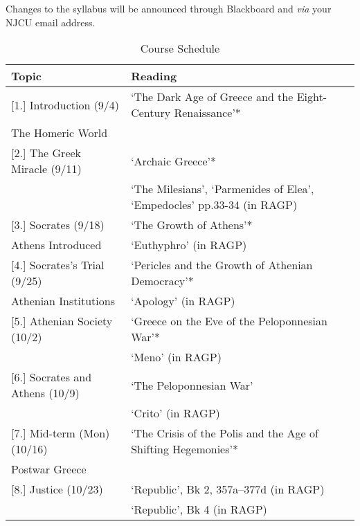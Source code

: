 \documentclass[article,oneside]{memoir}
\begin{document}
 Changes to the syllabus will be announced through Blackboard and \emph{via} your NJCU email address.  

\newpage
\begin{center}
\begin{longtable}{p{4.5cm}p{9cm}}
 
  \caption{Course Schedule} \\
  \toprule
  \textbf{Topic}   & \textbf{Reading} \\
  \midrule

  
[1.] Introduction (9/4) 				&  `The Dark Age of Greece and the Eight-Century Renaissance'* \\ 
The Homeric World					&     \\ [1\baselineskip] \midrule
	
[2.]  The Greek Miracle  (9/11)		 	& `Archaic Greece'* \\
								 &`The Milesians', `Parmenides of Elea', `Empedocles' pp.33-34  (in RAGP)  \\ [1\baselineskip] \midrule

[3.] Socrates (9/18)	  				& `The Growth of Athens'*\\
Athens Introduced					&`Euthyphro'  (in RAGP)  \\ [1\baselineskip] \midrule

[4.] Socrates's Trial (9/25)				& `Pericles and the Growth of Athenian Democracy'*   \\ 
Athenian Institutions					& `Apology' (in RAGP)	\\[1\baselineskip] \midrule

[5.] Athenian Society (10/2)						&  `Greece on the Eve of the Peloponnesian War'* \\
						    	    	&  `Meno' (in RAGP)	 \\ [1\baselineskip] \midrule


[6.] Socrates and Athens (10/9)			& `The Peloponnesian War' \\
								& `Crito' (in RAGP) \\ [1\baselineskip]  \midrule

[7.] Mid-term (Mon)	(10/16)		&  `The Crisis of the Polis and the Age of Shifting Hegemonies'*  	\\ 
Postwar Greece				& 	\\ [1\baselineskip] \midrule

[8.] Justice	(10/23)			&   `Republic', Bk 2, 357a--377d (in RAGP) \\
							&  `Republic', Bk 4 (in RAGP)  \\ [1\baselineskip] \midrule


\end{longtable}
\end{center}
\end{document}
